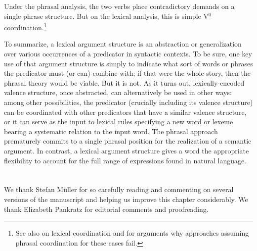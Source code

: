 \documentclass[output=paper
 	        ,biblatex
                ,babelshorthands
                ,newtxmath
                ,draftmode
                ,colorlinks, citecolor=brown
]{langscibook}
\begin{document}
\noindent
Under the phrasal analysis, the two verbs place contradictory demands on a single phrase structure.  But on the lexical analysis, this is simple V$^0$ coordination.\footnote{%
See also  on lexical coordination and for arguments why approaches assuming phrasal coordination for these cases fail.
}%
%
%
 
To summarize, a lexical argument structure is an abstraction or generalization over various occurrences of a predicator in syntactic contexts. To be sure, one key use of that argument structure is simply to indicate what sort of words or phrases the predicator must (or can) combine with; 
if that were the whole story, then the phrasal theory would be viable. But it is not. As it turns out, lexically-encoded valence structure, once abstracted, can alternatively be used in other ways: among other possibilities, the predicator (crucially including its valence structure) can be coordinated with other predicators that have a similar valence structure, or it can serve as the input to lexical rules specifying a new word or lexeme bearing a systematic relation to the input word.   The phrasal approach prematurely commits to a single phrasal position for the realization of 
a semantic argument.  In contrast, a lexical argument structure gives a word the appropriate flexibility to account for the full range of expressions found in natural language.   
 

\section*{\acknowledgmentsUS}

We thank Stefan Müller for so carefully reading and commenting on several versions of the manuscript  and helping us improve this chapter considerably. We thank Elizabeth Pankratz for editorial comments and proofreading.


%
{\sloppy
\printbibliography[heading=subbibliography,notkeyword=this] 
}
\end{document}
